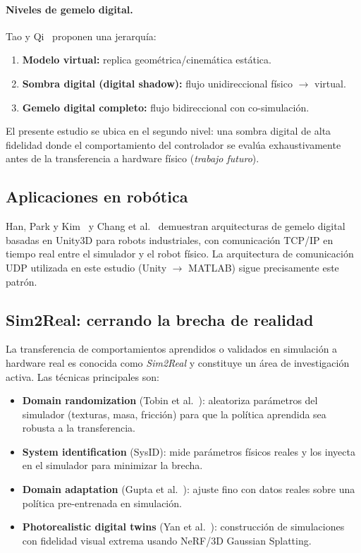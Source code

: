 \documentclass[12pt,a4paper,oneside]{book}
\begin{document}
\paragraph{Niveles de gemelo digital.} Tao y Qi~\cite{Tao2018,Tao2019} proponen una jerarquía:
\begin{enumerate}
    \item \textbf{Modelo virtual:} replica geométrica/cinemática estática.
    \item \textbf{Sombra digital (digital shadow):} flujo unidireccional físico $\to$ virtual.
    \item \textbf{Gemelo digital completo:} flujo bidireccional con co-simulación.
\end{enumerate}

El presente estudio se ubica en el segundo nivel: una sombra digital de alta fidelidad donde el comportamiento del controlador se evalúa exhaustivamente antes de la transferencia a hardware físico (\emph{trabajo futuro}).

\subsection{Aplicaciones en robótica}

Han, Park y Kim~\cite{Han2025} y Chang et al.~\cite{Chang2025} demuestran arquitecturas de gemelo digital basadas en Unity3D para robots industriales, con comunicación TCP/IP en tiempo real entre el simulador y el robot físico. La arquitectura de comunicación UDP utilizada en este estudio (Unity $\to$ MATLAB) sigue precisamente este patrón.

\subsection{Sim2Real: cerrando la brecha de realidad}

La transferencia de comportamientos aprendidos o validados en simulación a hardware real es conocida como \emph{Sim2Real} y constituye un área de investigación activa. Las técnicas principales son:

\begin{itemize}
    \item \textbf{Domain randomization} (Tobin et al.~\cite{Tobin2017}): aleatoriza parámetros del simulador (texturas, masa, fricción) para que la política aprendida sea robusta a la transferencia.
    \item \textbf{System identification} (SysID): mide parámetros físicos reales y los inyecta en el simulador para minimizar la brecha.
    \item \textbf{Domain adaptation} (Gupta et al.~\cite{GuptaDA2018}): ajuste fino con datos reales sobre una política pre-entrenada en simulación.
    \item \textbf{Photorealistic digital twins} (Yan et al.~\cite{Yan2025}): construcción de simulaciones con fidelidad visual extrema usando NeRF/3D Gaussian Splatting.
\end{itemize}
\end{document}
